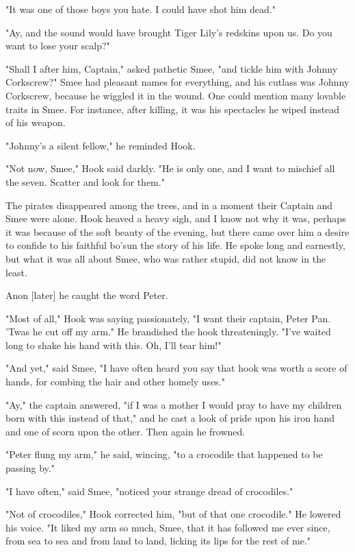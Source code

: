 "It was one of those boys you hate. I could have shot him dead."


"Ay, and the sound would have brought Tiger Lily's redskins upon us. Do
you want to lose your scalp?"


"Shall I after him, Captain," asked pathetic Smee, "and tickle him with
Johnny Corkscrew?" Smee had pleasant names for everything, and his cutlass
was Johnny Corkscrew, because he wiggled it in the wound. One could
mention many lovable traits in Smee. For instance, after killing, it was
his spectacles he wiped instead of his weapon.


"Johnny's a silent fellow," he reminded Hook.


"Not now, Smee," Hook said darkly. "He is only one, and I want to mischief
all the seven. Scatter and look for them."


The pirates disappeared among the trees, and in a moment their Captain and
Smee were alone. Hook heaved a heavy sigh, and I know not why it was,
perhaps it was because of the soft beauty of the evening, but there came
over him a desire to confide to his faithful bo'sun the story of his life.
He spoke long and earnestly, but what it was all about Smee, who was
rather stupid, did not know in the least.


Anon [later] he caught the word Peter.


"Most of all," Hook was saying passionately, "I want their captain, Peter
Pan. 'Twas he cut off my arm." He brandished the hook threateningly. "I've
waited long to shake his hand with this. Oh, I'll tear him!"


"And yet," said Smee, "I have often heard you say that hook was worth a
score of hands, for combing the hair and other homely uses."


"Ay," the captain answered, "if I was a mother I would pray to have my
children born with this instead of that," and he cast a look of pride upon
his iron hand and one of scorn upon the other. Then again he frowned.


"Peter flung my arm," he said, wincing, "to a crocodile that happened to
be passing by."


"I have often," said Smee, "noticed your strange dread of crocodiles."


"Not of crocodiles," Hook corrected him, "but of that one crocodile." He
lowered his voice. "It liked my arm so much, Smee, that it has followed me
ever since, from sea to sea and from land to land, licking its lips for
the rest of me."


